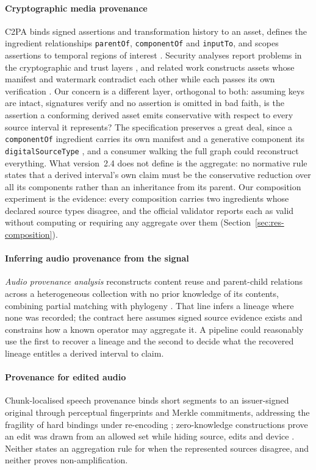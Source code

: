 \documentclass[preprint,3p,11pt,authoryear]{elsarticle}
\begin{document}
\paragraph{Cryptographic media provenance} C2PA binds signed assertions and
transformation history to an asset, defines the ingredient relationships
\texttt{parentOf}, \texttt{componentOf} and \texttt{inputTo}, and scopes
assertions to temporal regions of interest \citep[\S18.2.2.3,
\S18.16.3]{c2pa24}. Security analyses report problems in the cryptographic and
trust layers \citep{golaszewski2026c2pa}, and related work constructs assets
whose manifest and watermark contradict each other while each passes its own
verification \citep{nemecek2026contradictions}. Our concern is a different
layer, orthogonal to both: assuming keys are intact, signatures verify and no
assertion is omitted in bad faith, is the assertion a conforming derived asset
emits conservative with respect to every source interval it represents? The
specification preserves a great deal, since a \texttt{componentOf} ingredient
carries its own manifest and a generative component its
\texttt{digitalSourceType} \citep[\S18.16.3]{c2pa24}, and a consumer walking
the full graph could reconstruct everything. What version~2.4 does not define
is the aggregate: no normative rule states that a derived interval's own claim
must be the conservative reduction over all its components rather than an
inheritance from its parent. Our composition experiment is the evidence: every composition carries
two ingredients whose declared source types disagree, and the official
validator reports each as valid without computing or requiring any aggregate
over them (Section~\ref{sec:res-composition}).

\paragraph{Inferring audio provenance from the signal} \emph{Audio provenance
analysis} reconstructs content reuse and parent-child relations across a
heterogeneous collection with no prior knowledge of its contents, combining
partial matching with phylogeny \citep{gerhardt2024provenance}. That line
infers a lineage where none was recorded; the contract here assumes signed
source evidence exists and constrains how a known operator may aggregate it. A
pipeline could reasonably use the first to recover a lineage and the second to
decide what the recovered lineage entitles a derived interval to claim.

\paragraph{Provenance for edited audio} Chunk-localised speech provenance binds
short segments to an issuer-signed original through perceptual fingerprints and
Merkle commitments, addressing the fragility of hard bindings under re-encoding
\citep{ono2026merklespeech}; zero-knowledge constructions prove an edit was
drawn from an allowed set while hiding source, edits and device
\citep{fu2026trustvoice}. Neither states an aggregation rule for when the
represented sources disagree, and neither proves non-amplification.
\end{document}
